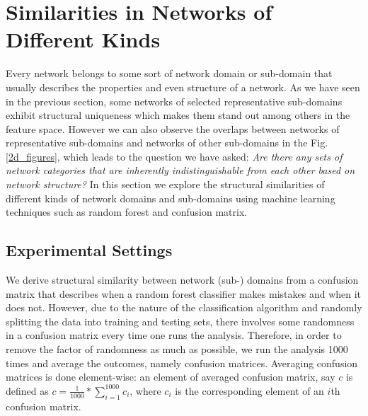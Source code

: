 %
%
%

\section{Similarities in Networks of Different Kinds}
Every network belongs to some sort of network domain or sub-domain that usually describes the properties and even structure of a network. As we have seen in the previous section, some networks of selected representative sub-domains exhibit structural uniqueness which makes them stand out among others in the feature space. However we can also observe the overlaps between networks of representative sub-domains and networks of other sub-domains in the Fig. \ref{2d_figures}, which leads to the question we have asked:  \textit{Are there any sets of network categories that are inherently indistinguishable from each other based on network structure?} In this section we explore the structural similarities of different kinds of network domains and sub-domains using machine learning techniques such as random forest and confusion matrix.  

\subsection{Experimental Settings}
We derive structural similarity between network (sub-) domains from a confusion matrix that describes when a random forest classifier makes mistakes and when it does not. However, due to the nature of the classification algorithm and randomly splitting the data into training and testing sets, there involves some randomness in a confusion matrix every time one runs the analysis. Therefore, in order to remove the factor of randomness as much as possible, we run the analysis 1000 times and average the outcomes, namely confusion matrices. Averaging confusion matrices is done element-wise: an element of averaged confusion matrix, say $c$ is defined as $c = \frac{1}{1000}*\sum_{i=1}^{1000} c_i$, where $c_i$ is the corresponding element of an $i$th confusion matrix.

